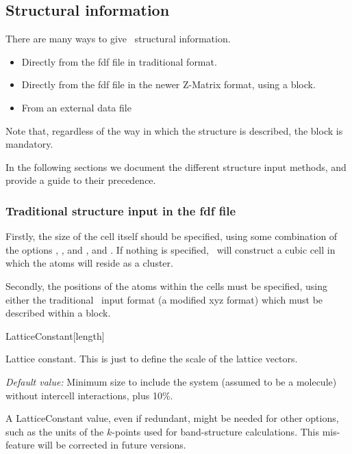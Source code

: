 \subsection{Structural information}

There are many ways to give \siesta\ structural information.

\begin{itemize}
  \item%
  Directly from the fdf file in traditional format.

  \item%
  Directly from the fdf file in the newer Z-Matrix format, using
  a  block.

  \item%
  From an external data file
\end{itemize}

Note that, regardless of the way in which the structure is described,
the  block is mandatory.

In the following sections we document the different structure input
methods, and provide a guide to their precedence.

\subsubsection{Traditional structure input in the fdf file}

Firstly, the size of the cell itself should be specified, using some
combination of the options ,
, and , and
.  If nothing is specified, \siesta\ will construct a
cubic cell in which the atoms will reside as a cluster.

Secondly, the positions of the atoms within the cells must be
specified, using either the traditional \siesta\ input format (a
modified xyz format) which must be described within a
 block.

\begin{fdfentry}{LatticeConstant}[length]

  Lattice constant. This is just to define the scale of the lattice
  vectors.

  \textit{Default value:} Minimum size to include the system (assumed
  to be a molecule) without intercell interactions, plus 10\%.

  \note A LatticeConstant value, even if redundant, might be needed
  for other options, such as the units of the $k$-points used for
  band-structure calculations. This mis-feature will be corrected in
  future versions.
  
\end{fdfentry}

